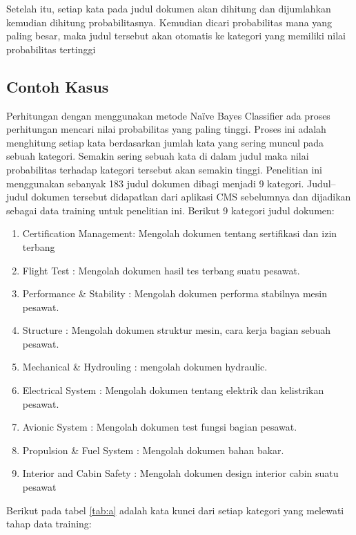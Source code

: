 \par Setelah itu, setiap kata pada judul dokumen akan dihitung dan dijumlahkan kemudian dihitung probabilitasnya. Kemudian dicari probabilitas mana yang paling besar, maka judul tersebut akan otomatis ke kategori yang memiliki nilai probabilitas tertinggi

\subsection{Contoh Kasus}
Perhitungan dengan menggunakan metode Naïve Bayes Classifier ada proses perhitungan mencari nilai probabilitas yang paling tinggi. Proses ini adalah menghitung setiap kata berdasarkan jumlah kata yang sering muncul pada sebuah kategori. Semakin sering sebuah kata di dalam judul maka nilai probabilitas terhadap kategori tersebut akan semakin tinggi. Penelitian ini menggunakan sebanyak 183 judul dokumen dibagi menjadi 9 kategori. Judul–judul dokumen tersebut didapatkan dari aplikasi CMS sebelumnya dan dijadikan sebagai data training untuk penelitian ini. Berikut 9 kategori judul dokumen:
    \begin{enumerate}
        \item 	Certification Management: Mengolah dokumen tentang sertifikasi dan izin terbang
    	\item Flight Test : Mengolah dokumen hasil tes terbang suatu pesawat.
	    \item Performance \& Stability : Mengolah dokumen performa stabilnya mesin pesawat.
	    \item Structure : Mengolah dokumen struktur mesin, cara kerja bagian sebuah pesawat.
        \item Mechanical \& Hydrouling : mengolah dokumen hydraulic.
    	\item Electrical System : Mengolah dokumen tentang elektrik dan kelistrikan pesawat.
	    \item Avionic System : Mengolah dokumen test fungsi bagian pesawat.
	    \item Propulsion \& Fuel System : Mengolah dokumen bahan bakar.
	    \item Interior and Cabin Safety : Mengolah dokumen design interior cabin suatu pesawat
    \end{enumerate}
    Berikut pada tabel \ref{tab:a} adalah kata kunci dari setiap kategori yang melewati tahap data training:
